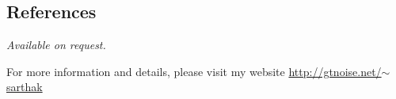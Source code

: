 \documentclass[margin,line]{resume}
\begin{document}
\begin{resume}
    \section{\mysidestyle \normalsize References}
    {\sl Available on request. \vspace{-4mm}}

    \centering
      \small For more information and details, please visit my website
    \href{http://gtnoise.net/~sarthak}{http://gtnoise.net/{\tiny$\sim$}sarthak}

%
\end{resume}
\end{document}
